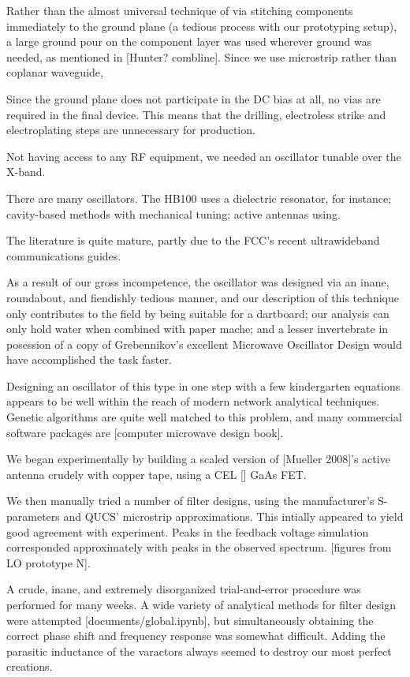 \documentclass[paper.tex]{subfiles}
\begin{document}
Rather than the almost universal technique of via stitching components immediately to the ground plane (a tedious process with our prototyping setup), a large ground pour on the component layer was used wherever ground was needed, as mentioned in [Hunter? combline]. Since we use microstrip rather than coplanar waveguide, 

Since the ground plane does not participate in the DC bias at all, no vias are required in the final device. This means that the drilling, electroless strike and electroplating steps are unnecessary for production.



Not having access to any RF equipment, we needed an oscillator tunable over the X-band.

There are many oscillators. The HB100 uses a dielectric resonator, for instance; cavity-based methods with mechanical tuning; active antennas using. 


The literature is quite mature, partly due to the FCC's recent ultrawideband communications guides.

As a result of our gross incompetence, the oscillator was designed via an inane, roundabout, and fiendishly tedious manner, and our description of this technique only contributes to the field by being suitable for a dartboard; our analysis can only hold water when combined with paper mache; and a lesser invertebrate in posession of a copy of Grebennikov's excellent Microwave Oscillator Design would have accomplished the task faster.


Designing an oscillator of this type in one step with a few kindergarten equations appears to be well within the reach of modern network analytical techniques. Genetic algorithms are quite well matched to this problem, and many commercial software packages are  [computer microwave design book]. 


We began experimentally by building a scaled version of [Mueller 2008]'s active antenna crudely with copper tape, using a CEL [] GaAs FET.


We then manually tried a number of filter designs, using the manufacturer's S-parameters and QUCS' microstrip approximations. This intially appeared to yield good agreement with experiment. Peaks in the feedback voltage simulation corresponded approximately with peaks in the observed spectrum. [figures from LO prototype N]. 

A crude, inane, and extremely disorganized trial-and-error procedure was performed for many weeks. A wide variety of analytical methods for filter design were attempted [documents/global.ipynb], but simultaneously obtaining the correct phase shift and frequency response was somewhat difficult. Adding the parasitic inductance of the varactors always seemed to destroy our most perfect creations.
\end{document}

